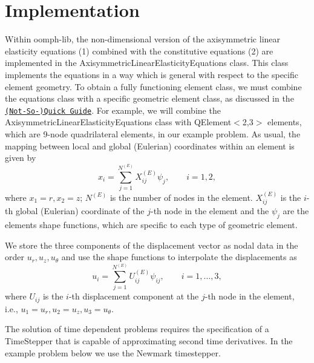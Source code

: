  

\hypertarget{index_element_types}{}\section{Implementation}\label{index_element_types}
Within {\ttfamily oomph-\/lib}, the non-\/dimensional version of the axisymmetric linear elasticity equations (1) combined with the constitutive equations (2) are implemented in the {\ttfamily Axisymmetric\+Linear\+Elasticity\+Equations} class. This class implements the equations in a way which is general with respect to the specific element geometry. To obtain a fully functioning element class, we must combine the equations class with a specific geometric element class, as discussed in the \href{../../../quick_guide/html/index.html}{\tt (Not-\/\+So-\/)Quick Guide}. For example, we will combine the {\ttfamily Axisymmetric\+Linear\+Elasticity\+Equations} class with {\ttfamily Q\+Element$<$2,3$>$} elements, which are 9-\/node quadrilateral elements, in our example problem. As usual, the mapping between local and global (Eulerian) coordinates within an element is given by \[ x_i = \sum_{j=1}^{N^{(E)}} X_{ij}^{(E)}\psi_j,\qquad i = 1,2, \] where $ x_1 = r, x_2 = z $; $ N^{(E)} $ is the number of nodes in the element. $ X_{ij}^{(E)} $ is the $ i $-\/th global (Eulerian) coordinate of the $ j $-\/th node in the element and the $ \psi_j $ are the element\textquotesingle{}s shape functions, which are specific to each type of geometric element.

We store the three components of the displacement vector as nodal data in the order $ u_r, u_z, u_\theta $ and use the shape functions to interpolate the displacements as \[ u_i = \sum_{j=1}^{N^{(E)}}U_{ij}^{(E)}\psi_{ij},\qquad i = 1,\dotsc,3, \] where $ U_{ij} $ is the $ i $-\/th displacement component at the $ j $-\/th node in the element, i.\+e., $ u_1=u_r, u_2=u_z,u_3=u_\theta $.

The solution of time dependent problems requires the specification of a {\ttfamily Time\+Stepper} that is capable of approximating second time derivatives. In the example problem below we use the Newmark timestepper.



 

